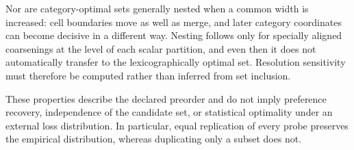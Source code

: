 Nor are category-optimal sets generally nested when a common width is increased: cell boundaries move as well as merge, and later category coordinates can become decisive in a different way. Nesting follows only for specially aligned coarsenings at the level of each scalar partition, and even then it does not automatically transfer to the lexicographically optimal set. Resolution sensitivity must therefore be computed rather than inferred from set inclusion.

These properties describe the declared preorder and do not imply preference recovery, independence of the candidate set, or statistical optimality under an external loss distribution. In particular, equal replication of every probe preserves the empirical distribution, whereas duplicating only a subset does not.
